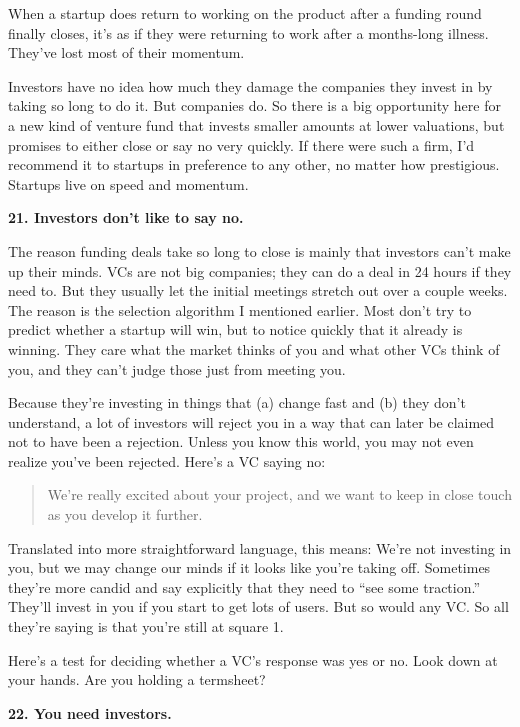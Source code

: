 When a startup does return to working on the product after a funding
round finally closes, it's as if they were returning to work after a
months-long illness. They've lost most of their momentum.

Investors have no idea how much they damage the companies they invest in
by taking so long to do it. But companies do. So there is a big
opportunity here for a new kind of venture fund that invests smaller
amounts at lower valuations, but promises to either close or say no very
quickly. If there were such a firm, I'd recommend it to startups in
preference to any other, no matter how prestigious. Startups live on
speed and momentum.

\textbf{21. Investors don't like to say no.}

The reason funding deals take so long to close is mainly that investors
can't make up their minds. VCs are not big companies; they can do a deal
in 24 hours if they need to. But they usually let the initial meetings
stretch out over a couple weeks. The reason is the selection algorithm I
mentioned earlier. Most don't try to predict whether a startup will win,
but to notice quickly that it already is winning. They care what the
market thinks of you and what other VCs think of you, and they can't
judge those just from meeting you.

Because they're investing in things that (a) change fast and (b) they
don't understand, a lot of investors will reject you in a way that can
later be claimed not to have been a rejection. Unless you know this
world, you may not even realize you've been rejected. Here's a VC saying
no:

\begin{quote}
We're really excited about your project, and we want to keep in close
touch as you develop it further.
\end{quote}

Translated into more straightforward language, this means: We're not
investing in you, but we may change our minds if it looks like you're
taking off. Sometimes they're more candid and say explicitly that they
need to ``see some traction.'' They'll invest in you if you start to get
lots of users. But so would any VC. So all they're saying is that you're
still at square 1.

Here's a test for deciding whether a VC's response was yes or no. Look
down at your hands. Are you holding a termsheet?

\textbf{22. You need investors.}

